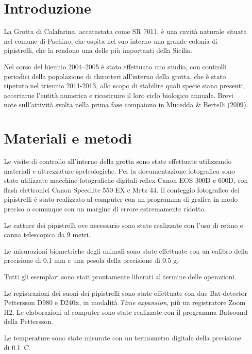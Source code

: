 \begin{multicols}{2}

\section*{Introduzione}
La Grotta di Calafarina, accatastata come SR 7011, è una cavità naturale situata nel comune di Pachino, che ospita nel suo interno una grande colonia di pipistrelli, che la rendono una delle più importanti della Sicilia.

Nel corso del biennio 2004--2005 è stato effettuato uno studio, con controlli periodici della popolazione di chirotteri all’interno della grotta, che è stato ripetuto nel triennio 2011-2013, allo scopo di stabilire quali specie siano presenti, accertarne l’entità numerica e ricostruire il loro ciclo biologico annuale. Brevi note sull’attività svolta nella prima fase compaiono in Mucedda \& Bertelli (2009).


\section*{Materiali e metodi}
Le visite di controllo all’interno della grotta sono state effettuate utilizzando materiali e attrezzature speleologiche. Per la documentazione fotografica sono state utilizzate macchine fotografiche digitali reflex Canon EOS 300D e 600D, con flash elettronici Canon Speedlite 550 EX e Metz 44. Il conteggio fotografico dei pipistrelli è stato realizzato al computer con un programma di grafica in modo preciso o comunque con un margine di errore estremamente ridotto.

Le catture dei pipistrelli ove necessario sono state realizzate con l’uso di retino e canna telescopica da 9 metri.

Le misurazioni biometriche degli animali sono state effettuate con un calibro della precisione di 0.1 mm e una pesola della precisione di 0.5 g.

Tutti gli esemplari sono stati prontamente liberati al termine delle operazioni. 

Le registrazioni dei suoni dei pipistrelli sono state effettuate con due Bat-detector Pettersson D980 e D240x, in modalità \textit{Time expansion}, più un registratore Zoom H2. Le elaborazioni al computer sono state realizzate con il programma Batsound della Pettersson.

Le temperature sono state misurate con un termometro digitale della precisione di 0.1\degree{}~C.


\end{multicols}
